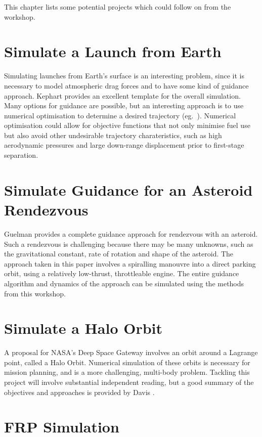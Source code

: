 \documentclass[12pt,openany]{book}
\begin{document}
This chapter lists some potential projects which could follow on from the workshop.

\section{Simulate a Launch from Earth}

Simulating launches from Earth's surface is an interesting problem, since it is necessary to model atmospheric drag forces and to have some kind of guidance approach. Kephart \cite{kephart1971} provides an excellent template for the overall simulation. Many options for guidance are possible, but an interesting approach is to use numerical optimisation to determine a desired trajectory (eg.\ \cite{dileep2015,dukeman2008}). Numerical optimisation could allow for objective functions that not only minimise fuel use but also avoid other undesirable trajectory charateristics, such as high aerodynamic pressures and large down-range displacement prior to first-stage separation.

\section{Simulate Guidance for an Asteroid Rendezvous}

Guelman \cite{guelman1991} provides a complete guidance approach for rendezvous with an asteroid. Such a rendezvous is challenging because there may be many unknowns, such as the gravitational constant, rate of rotation and shape of the asteroid. The approach taken in this paper involves a spiralling manouvre into a direct parking orbit, using a relatively low-thrust, throttleable engine. The entire guidance algorithm and dynamics of the approach can be simulated using the methods from this workshop.

\section{Simulate a Halo Orbit}

A proposal for NASA's Deep Space Gateway involves an orbit around a Lagrange point, called a Halo Orbit. Numerical simulation of these orbits is necessary for mission planning, and is a more challenging, multi-body problem. Tackling this project will involve substantial independent reading, but a good summary of the objectives and approaches is provided by Davis \cite{davis2017}.

\section{FRP Simulation}
\end{document}
